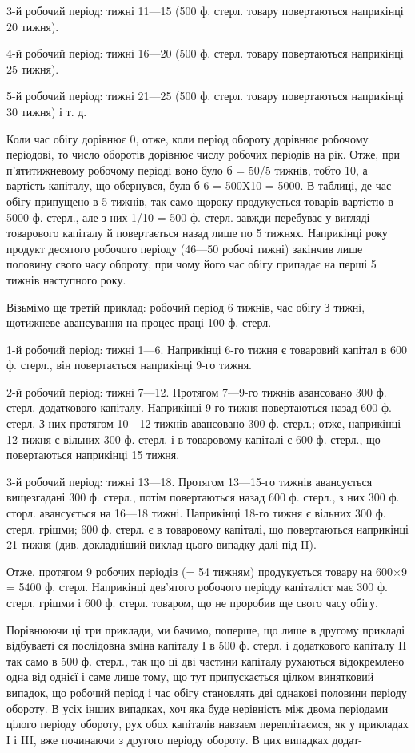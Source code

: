 3-й робочий період: тижні 11—15 (500 ф. стерл. товару повертаються
наприкінці 20 тижня).

4-й робочий період: тижні 16—20 (500 ф. стерл. товару повертаються
наприкінці 25 тижня).

5-й робочий період: тижні 21—25 (500 ф. стерл. товару повертаються
наприкінці 30 тижня) і т. д.

Коли час обігу дорівнює 0, отже, коли період обороту дорівнює
робочому періодові, то число оборотів дорівнює числу робочих періодів
на рік.
Отже, при п’ятитижневому робочому періоді воно було б = 50/5
тижнів, тобто 10, а вартість капіталу, що обернувся, була б 6 = 500X10 =
5000.
В таблиці, де час обігу припущено в 5 тижнів, так само щороку
продукується товарів вартістю в 5000 ф. стерл., але з них 1/10 = 500 ф.
стерл. завжди перебуває у вигляді товарового капіталу й повертається
назад лише по 5 тижнях. Наприкінці року продукт десятого робочого
періоду (46—50 робочі тижні) закінчив лише половину свого часу
обороту, при чому його час обігу припадає на перші 5 тижнів наступного року.

Візьмімо ще третій приклад: робочий період 6 тижнів, час обігу
З тижні, щотижневе авансування на процес праці 100 ф. стерл.

1-й робочий період: тижні 1—6. Наприкінці 6-го тижня є товаровий
капітал в 600 ф. стерл., він повертається наприкінці 9-го тижня.

2-й робочий період: тижні 7—12. Протягом 7—9-го тижнів авансовано
300 ф. стерл. додаткового капіталу. Наприкінці 9-го тижня повертаються
назад 600 ф. стерл. З них протягом 10—12 тижнів авансовано 300 ф.
стерл.; отже, наприкінці 12 тижня є вільних 300 ф. стерл. і в товаровому
капіталі є 600 ф. стерл., що повертаються наприкінці 15 тижня.

3-й робочий період: тижні 13—18. Протягом 13—15-го тижнів авансується
вищезгадані 300 ф. стерл., потім повертаються назад 600 ф. стерл.,
з них 300 ф. сторл. авансується на 16—18 тижні. Наприкінці 18-го тижня
є вільних 300 ф. стерл. грішми; 600 ф. стерл. є в товаровому капіталі,
що повертаються наприкінці 21 тижня (див. докладніший виклад
цього випадку далі під II).

Отже, протягом 9 робочих періодів (= 54 тижням) продукується товару
на 600×9 = 5400 ф. стерл. Наприкінці дев’ятого робочого періоду
капіталіст має 300 ф. стерл. грішми і 600 ф. стерл. товаром, що не
проробив ще свого часу обігу.

Порівнюючи ці три приклади, ми бачимо, поперше, що лише в другому
прикладі відбуваеті ся послідовна зміна капіталу І в 500 ф. стерл.
і додаткового капіталу II так само в 500 ф. стерл., так що ці дві частини
капіталу рухаються відокремлено одна від однієї і саме лише тому, що
тут припускається цілком винятковий випадок, що робочий період і час
обігу становлять дві однакові половини періоду обороту. В усіх інших
випадках, хоч яка буде нерівність між двома періодами цілого періоду
обороту, рух обох капіталів навзаєм переплітаємся, як у прикладах
І і III, вже починаючи з другого періоду обороту. В цих випадках додат-
